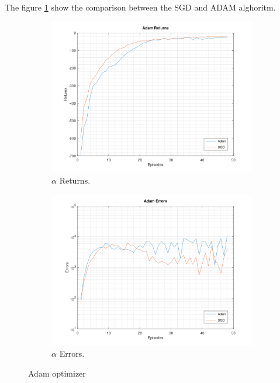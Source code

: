 \documentclass[a4paper,11pt]{article}
\begin{document}
The figure \ref{fig:adam} show the comparison between the SGD and ADAM alghoritm.

\begin{figure}[h!]
	\centering
	\begin{subfigure}[b]{0.4\linewidth}
		\includegraphics[width=\linewidth]{Adam-returns.png}
		\caption{$\alpha$ Returns.}
	\end{subfigure}
	\begin{subfigure}[b]{0.4\linewidth}
		\includegraphics[width=\linewidth]{Adam-errors.png}
		\caption{$\alpha$ Errors.}
	\end{subfigure}
	
	\caption{Adam optimizer}
	\label{fig:adam}
\end{figure}
\end{document}
